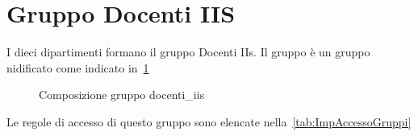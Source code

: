 \section{Gruppo Docenti IIS}
I dieci dipartimenti formano il gruppo Docenti IIs. Il gruppo è un gruppo nidificato come indicato in~\cref{fig:verticalidocenti}
\begin{figure}
	\centering
	
	\caption{Composizione gruppo docenti\_iis}
	\label{fig:verticalidocenti}
\end{figure}
Le  regole di accesso di questo gruppo sono elencate nella~\cref{tab:ImpAccessoGruppi}
